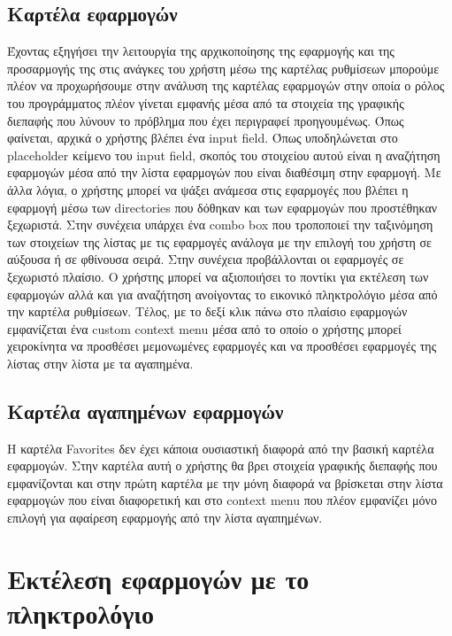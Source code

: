\subsection{Καρτέλα εφαρμογών}

Έχοντας εξηγήσει την λειτουργία της αρχικοποίησης της εφαρμογής και της προσαρμογής της στις
ανάγκες του χρήστη μέσω της καρτέλας ρυθμίσεων μπορούμε πλέον να προχωρήσουμε στην ανάλυση
της καρτέλας εφαρμογών στην οποία ο ρόλος του προγράμματος πλέον γίνεται εμφανής μέσα από τα
στοιχεία της γραφικής διεπαφής που λύνουν το πρόβλημα που έχει περιγραφεί προηγουμένως. 
Όπως φαίνεται, αρχικά ο χρήστης βλέπει ένα input field. Όπως υποδηλώνεται στο placeholder
κείμενο του input field, σκοπός του στοιχείου αυτού είναι η αναζήτηση εφαρμογών μέσα από την
λίστα εφαρμογών που είναι διαθέσιμη στην εφαρμογή. Με άλλα λόγια, ο χρήστης μπορεί να ψάξει 
ανάμεσα στις εφαρμογές που βλέπει η εφαρμογή μέσω των directories που δόθηκαν και των εφαρμογών
που προστέθηκαν ξεχωριστά. Στην συνέχεια υπάρχει ένα combo box που τροποποιεί την ταξινόμηση
των στοιχείων της λίστας με τις εφαρμογές ανάλογα με την επιλογή του χρήστη σε αύξουσα ή σε
φθίνουσα σειρά. Στην συνέχεια προβάλλονται οι εφαρμογές σε ξεχωριστό πλαίσιο. Ο χρήστης μπορεί
να αξιοποιήσει το ποντίκι για εκτέλεση των εφαρμογών αλλά και για αναζήτηση ανοίγοντας το εικονικό
πληκτρολόγιο μέσα από την καρτέλα ρυθμίσεων. Τέλος, με το δεξί κλικ πάνω στο πλαίσιο εφαρμογών
εμφανίζεται ένα custom context menu μέσα από το οποίο ο χρήστης μπορεί χειροκίνητα να προσθέσει
μεμονωμένες εφαρμογές και να προσθέσει εφαρμογές της λίστας στην λίστα με τα αγαπημένα.



\subsection{Καρτέλα αγαπημένων εφαρμογών}

Η καρτέλα Favorites δεν έχει κάποια ουσιαστική διαφορά από την βασική καρτέλα εφαρμογών. Στην 
καρτέλα αυτή ο χρήστης θα βρει στοιχεία γραφικής διεπαφής που εμφανίζονται και στην πρώτη καρτέλα
με την μόνη διαφορά να βρίσκεται στην λίστα εφαρμογών που είναι διαφορετική και στο context menu
που πλέον εμφανίζει μόνο επιλογή για αφαίρεση εφαρμογής από την λίστα αγαπημένων.


\section{Εκτέλεση εφαρμογών με το πληκτρολόγιο}

